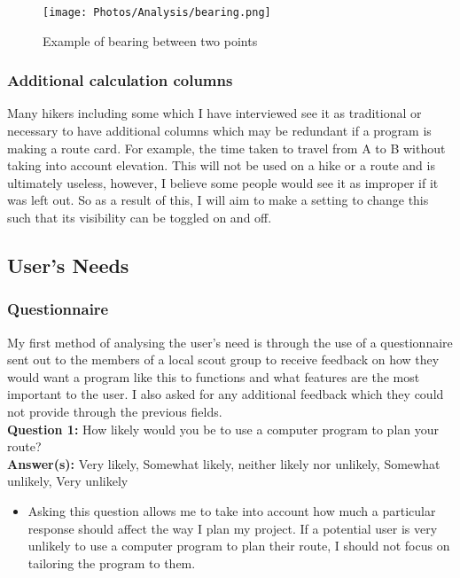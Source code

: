 \documentclass{article}
\newcommand{\QAnalysis}[4]{
    \noindent \textbf{Question #1: } #2 \\
    \noindent \textbf{Answer(s): } #3
    \begin{itemize}
        \item #4
    \end{itemize}
}
\begin{document}
            \begin{figure}[ht]
                \centering
                \texttt{[image: Photos/Analysis/bearing.png]}
                \caption{Example of bearing between two points}
                \label{fig:bearing-desmos}
            \end{figure}

        \subsubsection{Additional calculation columns}

            Many hikers including some which I have interviewed see it as traditional or necessary to have additional columns which may be redundant if a program is making a route card. For example, the time taken to travel from A to B without taking into account elevation. This will not be used on a hike or a route and is ultimately useless, however, I believe some people would see it as improper if it was left out. So as a result of this, I will aim to make a setting to change this such that its visibility can be toggled on and off.

    \subsection{User's Needs}

        \subsubsection{Questionnaire}

            My first method of analysing the user's need is through the use of a questionnaire sent out to the members of a local scout group to receive feedback on how they would want a program like this to functions and what features are the most important to the user. I also asked for any additional feedback which they could not provide through the previous fields. \\
            
            \QAnalysis{1}{How likely would you be to use a computer program to plan your route?}{Very likely, Somewhat likely, neither likely nor unlikely, Somewhat unlikely, Very unlikely}{Asking this question allows me to take into account how much a particular response should affect the way I plan my project. If a potential user is very unlikely to use a computer program to plan their route, I should not focus on tailoring the program to them.}
\end{document}
